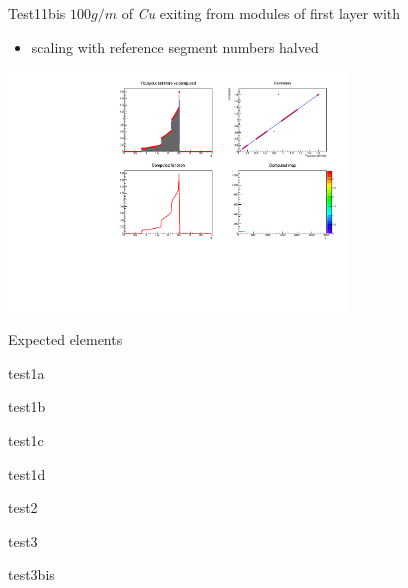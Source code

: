 \documentclass[pdftex, 11pt]{beamer}
\newcommand{\svntitlesize}{\tiny}
\newcommand{\svnbodysize}{\tiny}
\begin{document}
\begin{frame}
  \begin{block}{Test11bis}
    \alert{$100 g/m$} of \emph{Cu} exiting from modules of first layer with
    \begin{itemize}
    \item \alert{scaling} with reference \alert{segment numbers} halved
    \end{itemize}
  \end{block}
  \begin{center}
    \includegraphics[width=9cm]{img/test11bis.pdf}
  \end{center}
\end{frame}

\begin{frame}[fragile]{Expected elements}
  \begin{block}{\svntitlesize test1a}
    \svnbodysize
    
  \end{block}
  \begin{block}{\svntitlesize test1b}
    \svnbodysize
    
  \end{block}
  \begin{block}{\svntitlesize test1c}
    \svnbodysize
    
  \end{block}
  \begin{block}{\svntitlesize test1d}
    \svnbodysize
    
  \end{block}
\end{frame}

\begin{frame}[fragile]
  \begin{block}{\svntitlesize test2}
    \svnbodysize
    
  \end{block}
  \begin{block}{\svntitlesize test3}
    \svnbodysize
    
  \end{block}
  \begin{block}{\svntitlesize test3bis}
    \svnbodysize
    
  \end{block}
\end{frame}
\end{document}
